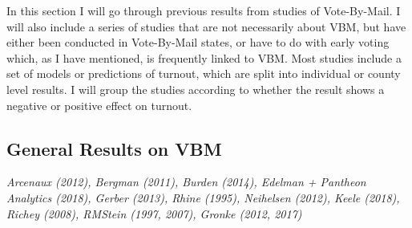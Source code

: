 \documentclass[12pt,twoside]{reedthesis}
\begin{document}
  In this section I will go through previous results from studies of
  Vote-By-Mail. I will also include a series of studies that are not
  necessarily about VBM, but have either been conducted in Vote-By-Mail
  states, or have to do with early voting which, as I have mentioned, is
  frequently linked to VBM. Most studies include a set of models or
  predictions of turnout, which are split into individual or county level
  results. I will group the studies according to whether the result shows
  a negative or positive effect on turnout.
  
  \subsection{General Results on VBM}\label{general-results-on-vbm}
  
  \emph{Arcenaux (2012), Bergman (2011), Burden (2014), Edelman + Pantheon
  Analytics (2018), Gerber (2013), Rhine (1995), Neihelsen (2012), Keele
  (2018), Richey (2008), RMStein (1997, 2007), Gronke (2012, 2017)}
  
\end{document}
